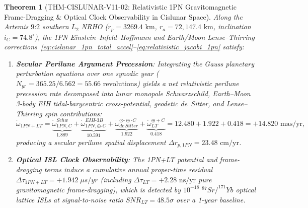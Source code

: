 \documentclass[11pt,a4paper,reqno]{article}
\def\bm#1{#1}%
\def\texttt#1{#1}%
\def\mathrm#1{#1}%
\def\mathbb#1{#1}%
\theoremstyle{plain}
\newtheorem{theorem}{Theorem}[section]
\theoremstyle{definition}
\theoremstyle{remark}
\numberwithin{equation}{section}
\begin{document}
\begin{theorem}[\texttt{THM-CISLUNAR-V11-02}: Relativistic 1PN Gravitomagnetic Frame-Dragging \& Optical Clock Observability in Cislunar Space]
\label{thm:cislunar_v11_1pn_lt}
Along the Artemis $9\text{:}2$ southern $L_2$ NRHO ($r_p = 3269.4\text{ km}$, $r_a = 72,147.4\text{ km}$, inclination $i_{\mathbb{C}} = 74.8^\circ$), the 1PN Einstein--Infeld--Hoffmann and Earth/Moon Lense--Thirring corrections~\eqref{eq:cislunar_1pn_total_accel}--\eqref{eq:relativistic_jacobi_1pn} satisfy:
\begin{enumerate}[label=(\roman*),leftmargin=2.2em,itemsep=2pt]
  \item \textbf{Secular Perilune Argument Precession}: Integrating the Gauss planetary perturbation equations over one synodic year ($N_{\mathrm{yr}} = 365.25 / 6.562 = 55.66\text{ revolutions}$) yields a net relativistic perilune precession rate decomposed into lunar monopole Schwarzschild, Earth--Moon 3-body EIH tidal-barycentric cross-potential, geodetic de~Sitter, and Lense--Thirring spin contributions:
  \begin{equation}
    \dot{\omega}_{\mathrm{1PN+LT}} = \underbrace{\dot{\omega}_{\mathrm{1PN,\mathbb{C}}}^{\mathrm{Schw}}}_{1.889} + \underbrace{\dot{\omega}_{\mathrm{1PN,\oplus\text{-}\mathbb{C}}}^{\mathrm{EIH\text{-}3B}}}_{10.591} + \underbrace{\dot{\omega}_{\mathrm{de\,Sitter}}^{\odot\text{-}\oplus\text{-}\mathbb{C}}}_{1.922} + \underbrace{\dot{\omega}_{\mathrm{LT}}^{\oplus+\mathbb{C}}}_{0.418} = 12.480 + 1.922 + 0.418 = \bm{+14.820\text{ mas/yr}},
    \label{eq:perilune_precession_1pn}
  \end{equation}
  producing a secular perilune spatial displacement $\Delta r_{p,\mathrm{1PN}} = \bm{23.48\text{ cm/yr}}$.
  \item \textbf{Optical ISL Clock Observability}: The 1PN+LT potential and frame-dragging terms induce a cumulative annual proper-time residual $\Delta\tau_{\mathrm{1PN+LT}} = \bm{+1.942\;\mu\mathrm{s/yr}}$ (including $\Delta\tau_{\mathrm{LT}} = \bm{+2.28\text{ ns/yr}}$ pure gravitomagnetic frame-dragging), which is detected by $10^{-18}$ $^{87}\mathrm{Sr}/^{171}\mathrm{Yb}$ optical lattice ISLs at signal-to-noise ratio $\mathrm{SNR}_{\mathrm{LT}} = \bm{48.5\sigma}$ over a 1-year baseline.
\end{enumerate}
\end{theorem}
\end{document}
